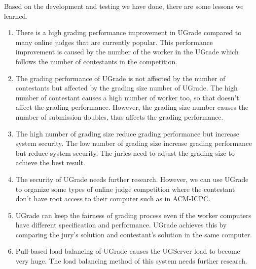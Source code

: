 \documentclass[conference]{IEEEtran}
\begin{document}
Based on the development and testing we have done, there are some lessons we learned.
\begin{enumerate}
    \item There is a high grading performance improvement in UGrade compared to many online judges that are currently popular. This performance improvement is caused by the number of the worker in the UGrade which follows the number of contestants in the competition.
    \item The grading performance of UGrade is not affected by the number of contestants but affected by the grading size number of UGrade. The high number of contestant causes a high number of worker too, so that doesn't affect the grading performance. However, the grading size number causes the number of submission doubles, thus affects the grading performance.
    \item The high number of grading size reduce grading performance but increase system security. The low number of grading size increase grading performance but reduce system security. The juries need to adjust the grading size to achieve the best result.
    \item The security of UGrade needs further research. However, we can use UGrade to organize some types of online judge competition where the contestant don't have root access to their computer such as in ACM-ICPC.
    \item UGrade can keep the fairness of grading process even if the worker computers have different specification and performance. UGrade achieves this by comparing the jury's solution and contestant's solution in the same computer.
    \item Pull-based load balancing of UGrade causes the UGServer load to become very huge. The load balancing method of this system needs further research.
\end{enumerate}
\end{document}
